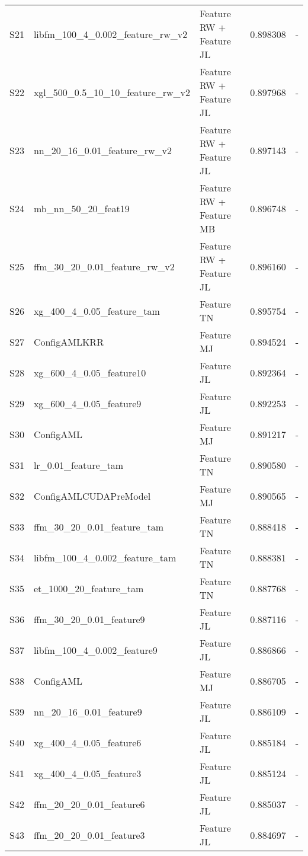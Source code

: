 \begin{table*}[t]
\begin{center}
\begin{tabular}{lllll}
S21	& libfm\_100\_4\_0.002\_feature\_rw\_v2	& Feature RW + Feature JL			& 0.898308	& - \\
S22  & xgl\_500\_0.5\_10\_10\_feature\_rw\_v2	& Feature RW + Feature JL			& 0.897968	& - \\
S23	& nn\_20\_16\_0.01\_feature\_rw\_v2	& Feature RW + Feature JL			& 0.897143	& - \\
S24	& mb\_nn\_50\_20\_feat19	& Feature RW + Feature MB					& 0.896748	& - \\
S25  & ffm\_30\_20\_0.01\_feature\_rw\_v2	& Feature RW + Feature JL			& 0.896160	& - \\
S26  & xg\_400\_4\_0.05\_feature\_tam	& Feature TN							& 0.895754	& - \\
S27	& ConfigAMLKRR		& Feature MJ									& 0.894524	& - \\
S28	& xg\_600\_4\_0.05\_feature10	& Feature JL								& 0.892364	& - \\
S29 	& xg\_600\_4\_0.05\_feature9	& Feature JL								& 0.892253	& - \\
S30 	& ConfigAML			& Feature MJ									& 0.891217	& - \\
S31	& lr\_0.01\_feature\_tam	& Feature TN									& 0.890580	& - \\
S32	& ConfigAMLCUDAPreModel	& Feature MJ								& 0.890565	& - \\
S33 	& ffm\_30\_20\_0.01\_feature\_tam	& Feature TN							& 0.888418	& - \\
S34	& libfm\_100\_4\_0.002\_feature\_tam	& Feature TN						& 0.888381	& - \\
S35	& et\_1000\_20\_feature\_tam	& Feature TN								& 0.887768	& - \\
S36 	& ffm\_30\_20\_0.01\_feature9	& Feature JL								& 0.887116	& - \\
S37	& libfm\_100\_4\_0.002\_feature9	& Feature JL							& 0.886866	& - \\
S38	& ConfigAML			& Feature MJ									& 0.886705	& - \\
S39	& nn\_20\_16\_0.01\_feature9	& Feature JL								& 0.886109	& - \\
S40 	& xg\_400\_4\_0.05\_feature6	& Feature JL								& 0.885184	& - \\
S41 	& xg\_400\_4\_0.05\_feature3	& Feature JL								& 0.885124	& - \\
S42 	& ffm\_20\_20\_0.01\_feature6	& Feature JL								& 0.885037	& - \\
S43	& ffm\_20\_20\_0.01\_feature3	& Feature JL								& 0.884697	& - \\

\end{tabular}
\end{center}
\end{table*}
